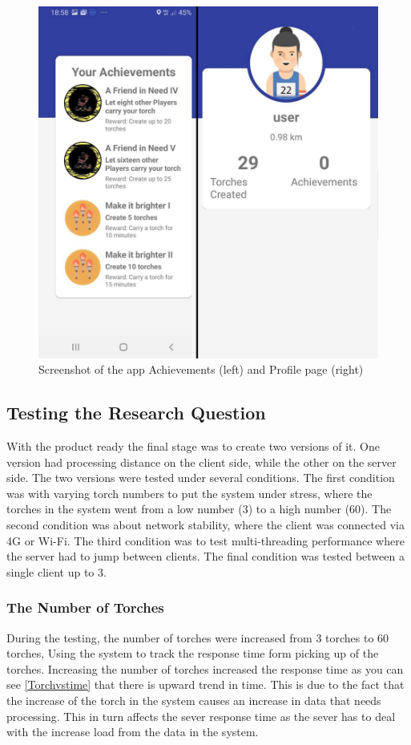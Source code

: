 \documentclass[12pt,a4paper,twoside]{report}
\begin{document}
 \begin{figure}
     \centering
     \includegraphics[width=0.5\linewidth]{achandprofiler.png}
     \caption{Screenshot of the app Achievements (left) and Profile page (right)}
     \label{fig:my_label}
 \end{figure}
 
 \subsection{Testing the Research Question}
 With the product ready the final stage was to create two versions of it. One version had processing distance on the client side, while the other on the server side. The two versions were tested under several conditions. The first condition was with varying torch numbers to put the system under stress, where the torches in the system went from a low number (3) to a high number (60). The second condition was about network stability, where the client was connected via 4G or Wi-Fi. The third condition was to test multi-threading performance where the server had to jump between clients. The final condition was tested between a single client up to 3. 

\subsubsection{The Number of Torches}

During the testing, the number of torches were increased from 3 torches to 60 torches, Using the system to track the response time form picking up of the torches. Increasing the number of torches increased the response time as you can see \autoref{Torchvstime} that there is upward trend in time. This is due to the fact that the increase of the torch in the system causes an increase in data that needs processing. This in turn affects the sever response time as the sever has to deal with the increase load from the data in the system. 
\end{document}
